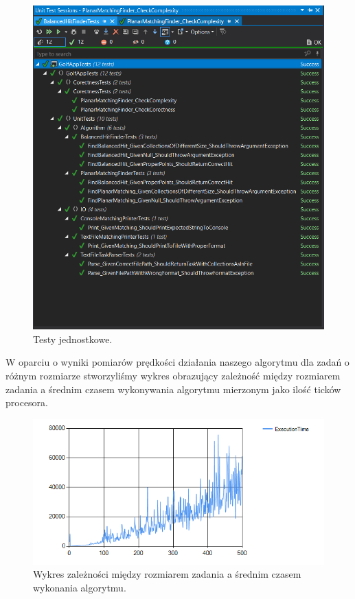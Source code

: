 \documentclass[10pt,a4paper]{article}
\begin{document}
	\begin{figure}[H]
		\centering
			\includegraphics[scale=0.6]{images/unittests.png}
 			\caption{Testy jednostkowe.}
 		\label{fig:unit_tests}
	\end{figure}	

	W oparciu o wyniki pomiarów prędkości działania naszego algorytmu dla zadań o różnym rozmiarze stworzyliśmy wykres obrazujący zależność między rozmiarem zadania a średnim czasem wykonywania algorytmu mierzonym jako ilość ticków procesora.
	
	\begin{figure}[H]
		\centering
		\includegraphics[scale=0.6]{images/execution_time_chart.png}
		\caption{Wykres zależności między rozmiarem zadania a średnim czasem wykonania algorytmu.}
		\label{fig:execution_time_chart}
	\end{figure}
	
\end{document}
